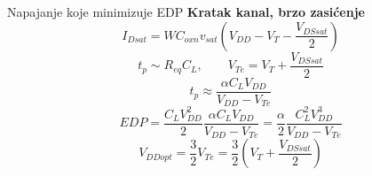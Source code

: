 \begin{frame}[label=09_2-s062]{Napajanje koje minimizuje EDP}
\textbf{Kratak kanal, brzo zasićenje}\[I_{Dsat}=WC_{oxn}v_{sat}\left(V_{DD}-V_T-\frac{V_{DSsat}}2\right)\]
\[t_p\sim R_{eq}C_L,\qquad V_{Te}=V_T+\frac{V_{DSsat}}2\]
\[t_p\approx\frac{\alpha C_LV_{DD}}{V_{DD}-V_{Te}}\]
\[EDP=\frac{C_LV_{DD}^2}2\frac{\alpha C_LV_{DD}}{V_{DD}-V_{Te}}=\frac\alpha2\frac{C_L^2V_{DD}^3}{V_{DD}-V_{Te}}\]
\[V_{DDopt}=\frac32V_{Te}=\frac32\left(V_T+\frac{V_{DSsat}}2\right)\]

\end{frame}
